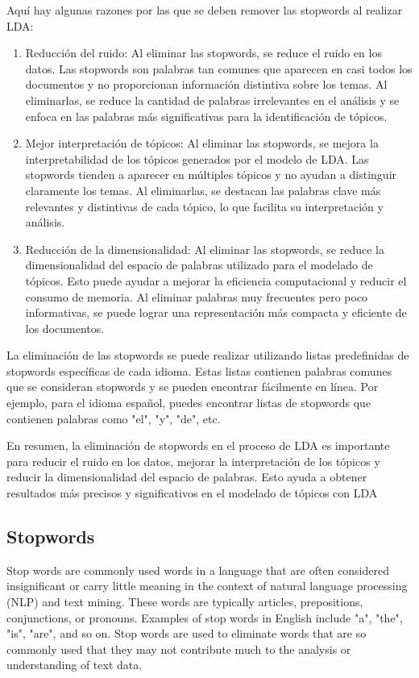 \documentclass[10pt]{article} %
\begin{document}
	Aquí hay algunas razones por las que se deben remover las stopwords al realizar LDA:
	\begin{enumerate}
		\item Reducción del ruido: Al eliminar las stopwords, se reduce el ruido en los datos. Las stopwords son palabras tan comunes que aparecen en casi todos los documentos y no proporcionan información distintiva sobre los temas. Al eliminarlas, se reduce la cantidad de palabras irrelevantes en el análisis y se enfoca en las palabras más significativas para la identificación de tópicos.
		
		\item 	Mejor interpretación de tópicos: Al eliminar las stopwords, se mejora la interpretabilidad de los tópicos generados por el modelo de LDA. Las stopwords tienden a aparecer en múltiples tópicos y no ayudan a distinguir claramente los temas. Al eliminarlas, se destacan las palabras clave más relevantes y distintivas de cada tópico, lo que facilita su interpretación y análisis.
		
		\item Reducción de la dimensionalidad: Al eliminar las stopwords, se reduce la dimensionalidad del espacio de palabras utilizado para el modelado de tópicos. Esto puede ayudar a mejorar la eficiencia computacional y reducir el consumo de memoria. Al eliminar palabras muy frecuentes pero poco informativas, se puede lograr una representación más compacta y eficiente de los documentos.
	\end{enumerate}
	
	La eliminación de las stopwords se puede realizar utilizando listas predefinidas de stopwords específicas de cada idioma. Estas listas contienen palabras comunes que se consideran stopwords y se pueden encontrar fácilmente en línea. Por ejemplo, para el idioma español, puedes encontrar listas de stopwords que contienen palabras como "el", "y", "de", etc.
	
	En resumen, la eliminación de stopwords en el proceso de LDA es importante para reducir el ruido en los datos, mejorar la interpretación de los tópicos y reducir la dimensionalidad del espacio de palabras. Esto ayuda a obtener resultados más precisos y significativos en el modelado de tópicos con LDA
	
	\subsection{Stopwords}
	
	Stop words are commonly used words in a language that are often considered insignificant or carry little meaning in the context of natural language processing (NLP) and text mining. These words are typically articles, prepositions, conjunctions, or pronouns. Examples of stop words in English include "a", "the", "is", "are", and so on. Stop words are used to eliminate words that are so commonly used that they may not contribute much to the analysis or understanding of text data.
	
\end{document}
